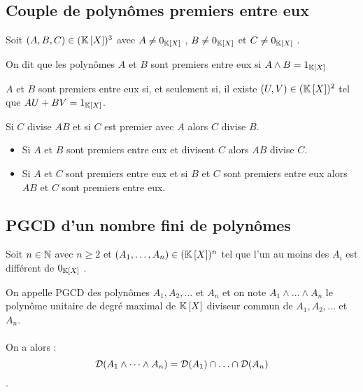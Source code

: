 \subsection{Couple de polynômes premiers entre eux}
Soit \((A, B, C) \in (\mathbb{K}\left[X\right])^3\) avec \(A\neq 0_{\mathbb{K}\left[X\right]}\) , \(B\neq 0_{\mathbb{K}\left[X\right]}\)  et \(C\neq 0_{\mathbb{K}\left[X\right]}\) .

\begin{defi}
    On dit que les polynômes \(A\) et \(B\) sont premiers entre eux si \(A \wedge B = 1_{\mathbb{K}\left[X\right]}\)
\end{defi}

\begin{theo}
    \(A\) et \(B\) sont premiers entre eux si, et seulement si, il existe \((U, V ) \in (\mathbb{K}\left[X\right])^2\) tel que \(AU + BV = 1_{\mathbb{K}\left[X\right]}\).
\end{theo}
\begin{defprop}
Si \(C\) divise \(AB\) et si \(C\) est premier avec \(A\) alors \(C\) divise \(B\).
\end{defprop}
\begin{defprop}
    \begin{itemize}
        \item Si \(A\) et \(B\) sont premiers entre eux et divisent \(C\) alors \(AB\) divise \(C\).
        \item Si \(A\) et \(C\) sont premiers entre eux et si \(B\) et \(C\) sont premiers entre eux alors \(AB\) et \(C\) sont premiers entre eux.
    \end{itemize}
\end{defprop}

\subsection{PGCD d’un nombre fini de polynômes}
Soit \(n \in \mathbb{N}\) avec \(n \geq 2\) et \((A_1, \dots , A_n) \in (\mathbb{K}\left[X\right])^n\) tel que l’un au moins des \(A_i\) est différent de \(0_{\mathbb{K}\left[X\right]}\) .

\begin{defprop}[PGCD]
    On appelle PGCD des polynômes \(A_1, A_2, \dots\) et \(A_n\) et on note \(A_1 \wedge \dots \wedge A_n\) le polynôme unitaire de degré maximal de \(\mathbb{K}\left[X\right]\) diviseur commun de \(A_1, A_2, \dots\) et \(A_n\).\\~\\
    On a alors :
    \[\cal{D}(A_1 \wedge \dots \wedge A_n) = \cal{D}(A_1) \inter \dots \inter \cal{D}(A_n)\].
\end{defprop}

